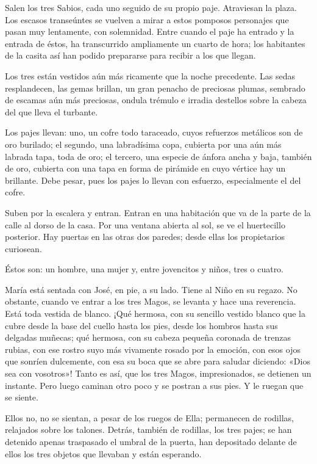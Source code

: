 \documentclass[12pt, twoside, openright]{book} %
\begin{document}
Salen los tres Sabios, cada uno seguido de su propio paje. Atraviesan la plaza. Los escasos transeúntes se vuelven a mirar a estos pomposos personajes que pasan muy lentamente, con solemnidad. Entre cuando el paje ha entrado y la entrada de éstos, ha transcurrido ampliamente un cuarto de hora; los habitantes de la casita así han podido prepararse para recibir a los que llegan. 

Los tres están vestidos aún más ricamente que la noche precedente. Las sedas resplandecen, las gemas brillan, un gran penacho de preciosas plumas, sembrado de escamas aún más preciosas, ondula trémulo e irradia destellos sobre la cabeza del que lleva el turbante. 

Los pajes llevan: uno, un cofre todo taraceado, cuyos refuerzos metálicos son de oro burilado; el segundo, una labradísima copa, cubierta por una aún más labrada tapa, toda de oro; el tercero, una especie de ánfora ancha y baja, también de oro, cubierta con una tapa en forma de pirámide en cuyo vértice hay un brillante. Debe pesar, pues los pajes lo llevan con esfuerzo, especialmente el del cofre. 

Suben por la escalera y entran. Entran en una habitación que va de la parte de la calle al dorso de la casa. Por una ventana abierta al sol, se ve el huertecillo posterior. Hay puertas en las otras dos paredes; desde ellas los propietarios curiosean. 

Éstos son: un hombre, una mujer y, entre jovencitos y niños, tres o cuatro. 

María está sentada con José, en pie, a su lado. Tiene al Niño en su regazo. No obstante, cuando ve entrar a los tres Magos, se levanta y hace una reverencia. Está toda vestida de blanco. ¡Qué hermosa, con su sencillo vestido blanco que la cubre desde la base del cuello hasta los pies, desde los hombros hasta sus delgadas muñecas; qué hermosa, con su cabeza pequeña coronada de trenzas rubias, con ese rostro suyo más vivamente rosado por la emoción, con esos ojos que sonríen dulcemente, con esa su boca que se abre para saludar diciendo: «Dios sea con vosotros»! Tanto es así, que los tres Magos, impresionados, se detienen un instante. Pero luego caminan otro poco y se postran a sus pies. Y le ruegan que se siente. 

Ellos no, no se sientan, a pesar de los ruegos de Ella; permanecen de rodillas, relajados sobre los talones. Detrás, también de rodillas, los tres pajes; se han detenido apenas traspasado el umbral de la puerta, han depositado delante de ellos los tres objetos que llevaban y están esperando. 
\end{document}
